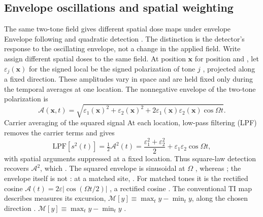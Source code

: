 \documentclass[11pt,a4paper]{article}
\providecommand{\DIFaddtex}[1]{{\protect\color{blue} \sf #1}} %
\providecommand{\DIFdeltex}[1]{{\protect\color{red} \scriptsize #1}} %
\providecommand{\DIFaddbegin}{} %
\providecommand{\DIFaddend}{} %
\providecommand{\DIFdelbegin}{} %
\providecommand{\DIFdelend}{} %
\providecommand{\DIFadd}[1]{\texorpdfstring{\DIFaddtex{#1}}{#1}} %
\providecommand{\DIFdel}[1]{\texorpdfstring{\DIFdeltex{#1}}{}} %
\begin{document}
\DIFdelend \subsection{Envelope oscillations and spatial weighting}\label{sec:envelope}
\DIFdelbegin \DIFdel{The same two-tone field gives different spatial dose maps under envelope }\DIFdelend \DIFaddbegin \DIFadd{Envelope }\DIFaddend following and quadratic detection \DIFdelbegin \DIFdel{. The distinction is the detector's response to the oscillating envelope, not a change in the applied field. Write }\DIFdelend \DIFaddbegin \DIFadd{assign different spatial doses
to the same field. At position }\DIFaddend $\mathbf x$\DIFdelbegin \DIFdel{for position and }\DIFdelend \DIFaddbegin \DIFadd{, let }\DIFaddend $\varepsilon_j(\mathbf x)$ \DIFdelbegin \DIFdel{for the signed local
}\DIFdelend \DIFaddbegin \DIFadd{be
the signed }\DIFaddend polarization of tone $j$ \DIFdelbegin \DIFdel{, projected }\DIFdelend along a fixed direction. \DIFdelbegin \DIFdel{These amplitudes vary
in space and are held fixed only during the temporal averages at one location.
}\DIFdelend The nonnegative
envelope \DIFaddbegin \DIFadd{of the two-tone polarization }\DIFaddend is
\[
\mathcal A(\mathbf x,t)=\sqrt{\varepsilon_1(\mathbf x)^2+\varepsilon_2(\mathbf x)^2
+2\varepsilon_1(\mathbf x)\varepsilon_2(\mathbf x)\cos\Omega t}.
\]
\DIFdelbegin \DIFdel{Carrier averaging of the squared signal }\DIFdelend \DIFaddbegin \DIFadd{At each location, low-pass filtering (LPF) removes the carrier terms and }\DIFaddend gives
\begin{equation}
\mathrm{LPF}[s^2(t)]=\tfrac12\mathcal A^2(t)
=\frac{\varepsilon_1^2+\varepsilon_2^2}{2}+\varepsilon_1\varepsilon_2\cos\Omega t,
\label{eq:sqenv}
\end{equation}
with spatial arguments suppressed\DIFdelbegin \DIFdel{at a fixed location. Thus square-law detection recovers $\mathcal A^2$,
which }\DIFdelend \DIFaddbegin \DIFadd{. The squared envelope }\DIFaddend is sinusoidal at
$\Omega$\DIFdelbegin \DIFdel{, whereas }\DIFdelend \DIFaddbegin \DIFadd{; }\DIFaddend the envelope itself is not\DIFdelbegin \DIFdel{: at a matched site, }\DIFdelend \DIFaddbegin \DIFadd{. For matched tones it is the rectified
cosine }\DIFaddend $\mathcal A(t)=2\varepsilon|\cos(\Omega t/2)|$\DIFdelbegin \DIFdel{, a rectified
cosine }\DIFdelend .
The conventional TI map \DIFdelbegin \DIFdel{describes }\DIFdelend \DIFaddbegin \DIFadd{measures }\DIFaddend its excursion,
\DIFdelbegin \DIFdel{$\mathcal{M}[y]\equiv\max_t y-\min_t y$, along the chosen direction \cite{grossman2017}.
}\DIFdelend \DIFaddbegin \DIFadd{$\mathcal M[y]\equiv\max_t y-\min_t y$ \cite{grossman2017}.
}
\end{document}
